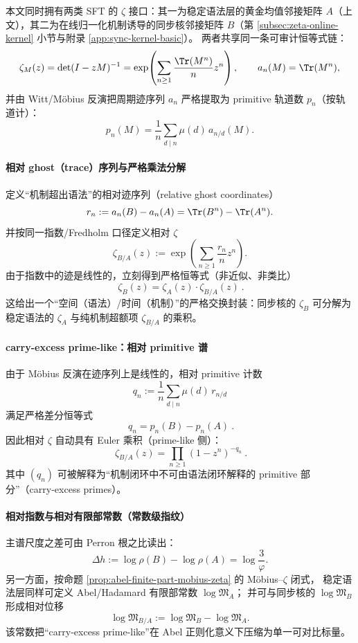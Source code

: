 \begin{remark}\label{rem:relative-zeta-sync-vs-grammar}
本文同时拥有两类 SFT 的 \(\zeta\) 接口：其一为稳定语法层的黄金均值邻接矩阵 \(A\)（上文），其二为在线归一化机制诱导的同步核邻接矩阵 \(B\)（第 \ref{subsec:zeta-online-kernel} 小节与附录 \ref{app:sync-kernel-basic}）。
两者共享同一条可审计恒等式链：
\[
\zeta_M(z)=\det(I-zM)^{-1}
=\exp\!\left(\sum_{n\ge 1}\frac{\Tr(M^n)}{n}z^n\right),
\qquad
a_n(M)=\Tr(M^n),
\]
并由 Witt/Möbius 反演把周期迹序列 \(a_n\) 严格提取为 primitive 轨道数 \(p_n\)（按轨道计）：
\[
p_n(M)=\frac{1}{n}\sum_{d\mid n}\mu(d)\,a_{n/d}(M).
\]

\paragraph{相对 ghost（trace）序列与严格乘法分解}
定义“机制超出语法”的相对迹序列（relative ghost coordinates）
\[
r_n:=a_n(B)-a_n(A)=\Tr(B^n)-\Tr(A^n).
\]
并按同一指数/Fredholm 口径定义相对 \(\zeta\)
\[
\zeta_{B/A}(z):=\exp\!\left(\sum_{n\ge 1}\frac{r_n}{n}z^n\right).
\]
由于指数中的迹是线性的，立刻得到严格恒等式（非近似、非类比）
$$
\boxed{\ \zeta_B(z)=\zeta_A(z)\cdot \zeta_{B/A}(z)\ }.
$$
这给出一个“空间（语法）/时间（机制）”的严格交换封装：同步核的 \(\zeta_B\) 可分解为稳定语法的 \(\zeta_A\) 与纯机制超额项 \(\zeta_{B/A}\) 的乘积。

\paragraph{carry-excess prime-like：相对 primitive 谱}
由于 Möbius 反演在迹序列上是线性的，相对 primitive 计数
\[
q_n:=\frac{1}{n}\sum_{d\mid n}\mu(d)\,r_{n/d}
\]
满足严格差分恒等式
$$
\boxed{\ q_n=p_n(B)-p_n(A)\ }.
$$
因此相对 \(\zeta\) 自动具有 Euler 乘积（prime-like 侧）：
$$
\boxed{\ \zeta_{B/A}(z)=\prod_{n\ge 1}(1-z^n)^{-q_n}\ }.
$$
其中 \((q_n)\) 可被解释为“机制闭环中不可由语法闭环解释的 primitive 部分”（carry-excess primes）。

\paragraph{相对指数与相对有限部常数（常数级指纹）}
主谱尺度之差可由 Perron 根之比读出：
\[
\Delta h:=\log\rho(B)-\log\rho(A)=\log\frac{3}{\varphi}.
\]
另一方面，按命题 \ref{prop:abel-finite-part-mobius-zeta} 的 Möbius--\(\zeta\) 闭式，
稳定语法层同样可定义 Abel/Hadamard 有限部常数 \(\log\mathfrak{M}_A\)；
并可与同步核的 \(\log\mathfrak{M}_B\) 形成相对位移
\[
\log\mathfrak{M}_{B/A}:=\log\mathfrak{M}_B-\log\mathfrak{M}_A.
\]
该常数把“carry-excess prime-like”在 Abel 正则化意义下压缩为单一可对比标量。


\end{remark}
